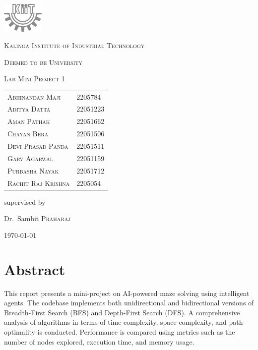 \documentclass[final, journal, 11pt]{report}
\begin{document}
	\begin{titlepage}
		\centering
		\includegraphics[width=0.15\textwidth]{./assets/bw_kiit.png}\par\vspace{1cm}
		{\LARGE \textsc{Kalinga Institute of Industrial Technology}\par}
		{\textsc{Deemed to be University}\par}
		\vspace{1cm}
		{\Large \textsc{Lab Mini Project 1}\par}
		\vspace{1.5cm}
		{\huge{}\par}
		\vspace{1cm}
			\begin{tabular}{ll}
					\textsc{Abhinandan Maji}   & 2205784  \\
					\textsc{Aditya Datta}      & 22051223 \\
					\textsc{Aman Pathak}       & 22051662 \\
					\textsc{Chayan Bera}       & 22051506 \\
					\textsc{Devi Prasad Panda} & 22051511 \\
					\textsc{Garv Agarwal}      & 22051159 \\
					\textsc{Purbasha Nayak}    & 22051712 \\
					\textsc{Rachit Raj Krishna} & 2205054  \\
				\end{tabular}
				\vspace{0.5cm}					
		\vfill
		supervised by\par
		Dr.~Sambit \textsc{Praharaj}
	
		\vfill
	
		{\large \today\par}
	\end{titlepage}
	
	\section*{Abstract}
	This report presents a mini-project on AI-powered maze solving using intelligent agents. The codebase implements both unidirectional and bidirectional versions of Breadth-First Search (BFS) and Depth-First Search (DFS). A comprehensive analysis of algorithms in terms of time complexity, space complexity, and path optimality is conducted. Performance is compared using metrics such as the number of nodes explored, execution time, and memory usage.
	
\end{document}
